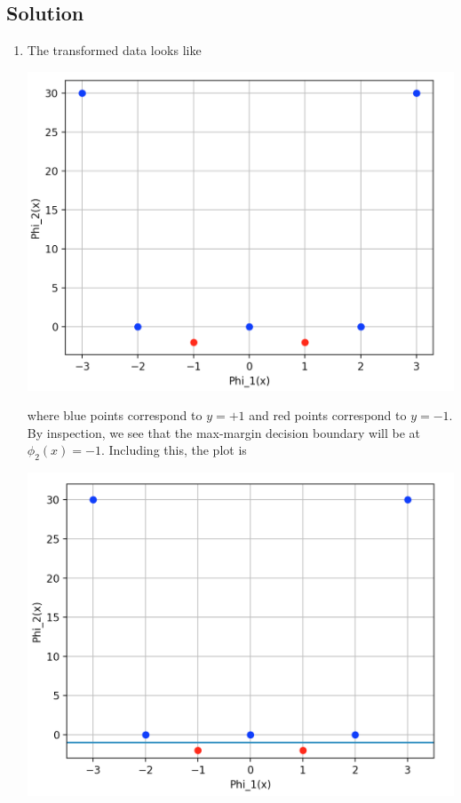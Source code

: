 \documentclass[submit]{harvardml}
\begin{document}
\subsection*{Solution}

\begin{enumerate}
    \item The transformed data looks like
    
    \begin{center}
        \includegraphics[scale=0.5]{1_11.png}
    \end{center}
    
    where blue points correspond to $y = +1$ and red points correspond to $y=-1$. By inspection, we see that the max-margin decision boundary will be at $\phi_2(x) = -1$. Including this, the plot is
    
    \begin{center}
        \includegraphics[scale=0.5]{1_1.png}
    \end{center}
    

\end{enumerate}
\end{document}
